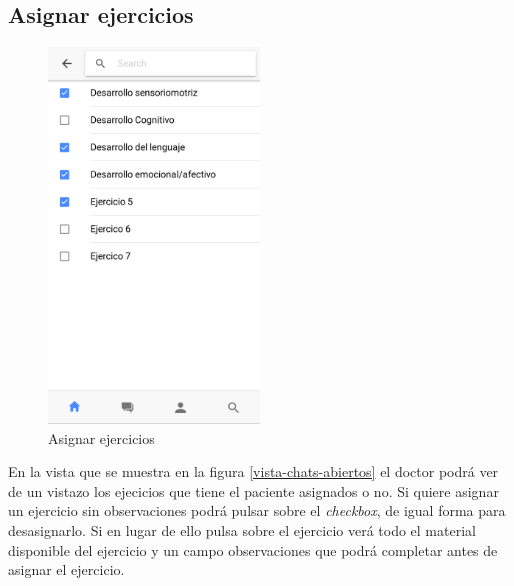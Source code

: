 \subsection{Asignar ejercicios}
\begin{figure}[!h]
    \centering
    \includegraphics[width=0.5\textwidth]{images/screenshots/doctor-assign-exercise.png}
    \caption{Asignar ejercicios}
    \label{doctor-assign-exercise}
\end{figure}

En la vista que se muestra en la figura \ref{vista-chats-abiertos} el doctor podrá
ver de un vistazo los ejecicios que tiene el paciente asignados o no. Si quiere
asignar un ejercicio sin observaciones podrá pulsar sobre el \textit{checkbox}, de
igual forma para desasignarlo. Si en lugar de ello pulsa sobre el ejercicio verá todo
el material disponible del ejercicio y un campo observaciones que podrá completar antes
de asignar el ejercicio.
\clearpage

